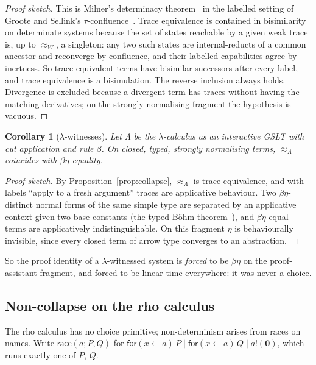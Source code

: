 \documentclass[11pt]{article}
\theoremstyle{plain}
\newtheorem{corollary}[theorem]{Corollary}
\theoremstyle{definition}
\theoremstyle{remark}
\newcommand{\Lam}{\Lambda}
\newcommand{\bisW}[1]{\approx_{#1}}
\newcommand{\inp}[3]{\mathsf{for}(#1 \leftarrow #2)\,#3}
\newcommand{\out}[2]{#1!(#2)}
\newcommand{\nil}{\mathbf{0}}
\begin{document}
\begin{proof}[Proof sketch]
This is Milner's determinacy theorem~\cite{MilnerCCS} in the labelled setting
of Groote and Sellink's $\tau$-confluence~\cite{GrooteSellink}. Trace
equivalence is contained in bisimilarity on determinate systems because the
set of states reachable by a given weak trace is, up to $\bisW{W}$, a
singleton: any two such states are internal-reducts of a common ancestor and
reconverge by confluence, and their labelled capabilities agree by inertness.
So trace-equivalent terms have bisimilar successors after every label, and
trace equivalence is a bisimulation. The reverse inclusion always holds.
Divergence is excluded because a divergent term has traces without having the
matching derivatives; on the strongly normalising fragment the hypothesis is
vacuous.
\end{proof}

\begin{corollary}[$\lambda$-witnesses]\label{cor:lambda}
Let $\Lam$ be the $\lambda$-calculus as an interactive GSLT with cut
application and rule $\beta$. On closed, typed, strongly normalising terms,
$\bisW{\Lam}$ coincides with $\beta\eta$-equality.
\end{corollary}

\begin{proof}[Proof sketch]
By Proposition~\ref{prop:collapse}, $\bisW{\Lam}$ is trace equivalence, and
with labels ``apply to a fresh argument'' traces are applicative behaviour.
Two $\beta\eta$-distinct normal forms of the same simple type are separated by
an applicative context given two base constants (the typed B\"ohm
theorem~\cite{Statman83}), and $\beta\eta$-equal terms are applicatively
indistinguishable. On this fragment $\eta$ is behaviourally invisible, since
every closed term of arrow type converges to an abstraction.
\end{proof}

So the proof identity of a $\lambda$-witnessed system is \emph{forced} to be
$\beta\eta$ on the proof-assistant fragment, and forced to be linear-time
everywhere: it was never a choice.

\subsection{Non-collapse on the rho calculus}

The rho calculus has no choice primitive; non-determinism arises from races
on names. Write $\mathsf{race}(a; P, Q)$ for
$\inp{x}{a}{P} \mid \inp{x}{a}{Q} \mid \out{a}{\nil}$, which runs exactly one
of $P$, $Q$.
\end{document}
